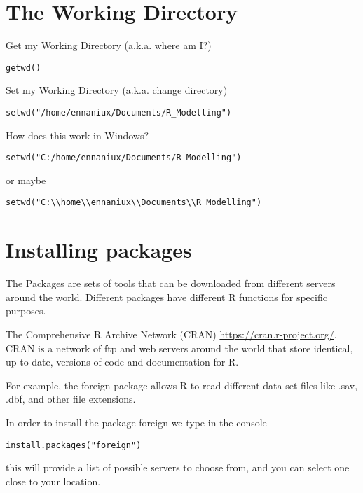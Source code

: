 \documentclass[11pt]{article}
\begin{document}
\section{The Working Directory}
\label{sec:orgce8b3b4}

Get my Working Directory (a.k.a. where am I?)
\begin{verbatim}
getwd()
\end{verbatim}


Set my Working Directory (a.k.a. change directory)
\begin{verbatim}
setwd("/home/ennaniux/Documents/R_Modelling")
\end{verbatim}

How does this work in Windows?
\begin{verbatim}
setwd("C:/home/ennaniux/Documents/R_Modelling")
\end{verbatim}

or maybe 
\begin{verbatim}
setwd("C:\\home\\ennaniux\\Documents\\R_Modelling")
\end{verbatim}


\section{Installing packages}
\label{sec:org00bf062}

The Packages are sets of tools that can be downloaded from different
servers around the world. Different packages have different R
functions for specific purposes.


The Comprehensive R Archive Network (CRAN)
\url{https://cran.r-project.org/}. CRAN is a network of ftp and web servers
around the world that store identical, up-to-date, versions of code
and documentation for R.

For example, the foreign package allows R to read different data set
files like .sav, .dbf, and other file extensions.

In order to install the package foreign we type in the console
\begin{verbatim}
install.packages("foreign")
\end{verbatim}

this will provide a list of possible servers to choose from, and you
can select one close to your location.
\end{document}
